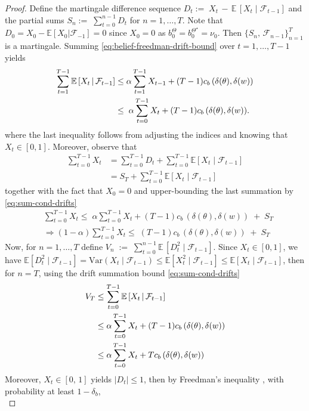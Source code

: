 \documentclass[10pt]{article} %
\theoremstyle{plain}
\theoremstyle{definition}
\theoremstyle{remark}
\newcommand{\bE}{\mathbb{E}}
\newcommand{\cF}{\mathcal{F}}
\begin{document}
\begin{proof}
Define the martingale difference sequence $D_t:=\; X_t\,-\,\bE\,[X_t\mid\mathcal F_{t-1}]$ and the partial sums $S_n:=\;\sum_{t=0}^{n-1}D_t$ for $n=1, \dots, T$. Note that $D_0=X_0-\bE[X_0|\cF_{-1}]=0$ since $X_0=0$ as $b_0^\Theta=b_0^{\Theta^\star}=\nu_0$. Then $\big\{S_n,\,\cF_{n-1}\big\}_{n=1}^{T}$ is a martingale. Summing \ref{eq:belief-freedman-drift-bound} over $t=1,\dots,T-1$ yields
\begin{align}
\sum_{t=1}^{T-1}\bE \left[X_t\,\middle|\,\mathcal F_{t-1}\right]
&\le \alpha\sum_{t=1}^{T-1}X_{t-1}+(T-1)c_b\,(\delta(\theta),\delta(w))\notag\\
&\le\; \alpha\sum_{t=0}^{T-1}X_t+(T-1)c_b\,(\delta(\theta),\delta(w)).\label{eq:sum-cond-drifts}
\end{align}
where the last inequality follows from adjusting the indices and knowing that $X_t\in[0,1]$. Moreover, observe that
\begin{align*}
\sum_{t=0}^{T-1}X_t&=\sum_{t=0}^{T-1}D_t + \sum_{t=0}^{T-1}\bE[X_t\mid\mathcal F_{t-1}]\\
&=S_{T}+\sum_{t=0}^{T-1}\bE[X_t\mid\mathcal F_{t-1}]
\end{align*}
together with the fact that $X_0=0$ and upper-bounding the last summation by \ref{eq:sum-cond-drifts}
\begin{align}
\label{eq:sumX-drift}
&\sum_{t=0}^{T-1}X_t
\le\; \alpha\sum_{t=0}^{T-1}X_t+(T-1)c_b\,(\delta(\theta),\delta(w)) \;+\; S_{T}\\
&\Rightarrow (1-\alpha)\sum_{t=0}^{T-1}X_t
\le\;(T-1)c_b\,(\delta(\theta),\delta(w)) \;+\; S_{T}
\end{align}
Now, for $n=1,\dots, T$ define \(
V_n \;:=\;\sum_{t=0}^{n-1}\bE\,[D_t^2\mid\mathcal F_{t-1}]
\). Since $X_t\in[0,1]$, we have $\bE[D_t^2\mid\mathcal F_{t-1}] = \text{Var}(X_t\mid\mathcal F_{t-1}) \le \bE[X_t^2\mid\mathcal F_{t-1}]\le \bE[X_t\mid\mathcal F_{t-1}]$, then for $n=T$, using the drift summation bound \ref{eq:sum-cond-drifts} 
\begin{align}
V_{T}
&\le \sum_{t=0}^{T-1}\bE \left[X_t\,\middle|\,\cF_{t-1}\right]\notag\\
&\le \alpha\sum_{t=0}^{T-1}X_t+(T-1)c_b\,(\delta(\theta),\delta(w))\notag\\
&\le \alpha\sum_{t=0}^{T-1}X_t+T c_b\,(\delta(\theta),\delta(w))
\label{eq:V-tight-bound}
\end{align}
Moreover, $X_t\in[0,\,1]$ yields $|D_t|\le1$, then by Freedman's inequality \cite{Freedman1975}, with probability at least $1-\delta_b$,
\begin{equation}\label{eq:freedman-applied}

\end{equation}
\end{proof}
\end{document}

